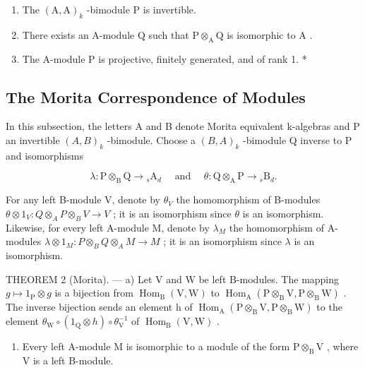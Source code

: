 \begin{enumerate}
\def\labelenumi{(\roman{enumi})}
\item
  The \((\mathrm{A},\mathrm{A})_{k}\) -bimodule P is invertible.
\item
  There exists an A-module \(\mathrm{Q}\) such that \(\mathrm{P} \otimes_{\mathrm{A}} \mathrm{Q}\) is isomorphic to \(\mathrm{A}\) .
\item
  The A-module P is projective, finitely generated, and of rank 1. *
\end{enumerate}

\subsection{The Morita Correspondence of Modules}

In this subsection, the letters A and B denote Morita equivalent k-algebras and P an invertible \((A,B)_{k}\) -bimodule. Choose a \((B,A)_{k}\) -bimodule Q inverse to P and isomorphisms

\[
\lambda : \mathrm{P} \otimes_ {\mathrm{B}} \mathrm{Q} \rightarrow {} _ {s} \mathrm{A} _ {d} \quad \text { and } \quad \theta : \mathrm{Q} \otimes_ {\mathrm{A}} \mathrm{P} \rightarrow {} _ {s} \mathrm{B} _ {d}.
\]

For any left B-module V, denote by \(\theta_{V}\) the homomorphism of B-modules \(\theta\otimes1_{V}:Q\otimes_{A}P\otimes_{B}V\to V\) ; it is an isomorphism since \(\theta\) is an isomorphism. Likewise, for every left A-module M, denote by \(\lambda_{M}\) the homomorphism of A-modules \(\lambda\otimes1_{M}:P\otimes_{B}Q\otimes_{A}M\to M\) ; it is an isomorphism since \(\lambda\) is an isomorphism.

THEOREM 2 (Morita). --- a) Let V and W be left B-modules. The mapping \(g \mapsto 1_{\mathrm{P}} \otimes g\) is a bijection from \(\operatorname{Hom}_{\mathrm{B}}(\mathrm{V}, \mathrm{W})\) to \(\operatorname{Hom}_{\mathrm{A}}(\mathrm{P} \otimes_{\mathrm{B}} \mathrm{V}, \mathrm{P} \otimes_{\mathrm{B}} \mathrm{W})\) . The inverse bijection sends an element h of \(\operatorname{Hom}_{\mathrm{A}}(\mathrm{P} \otimes_{\mathrm{B}} \mathrm{V}, \mathrm{P} \otimes_{\mathrm{B}} \mathrm{W})\) to the element \(\theta_{\mathrm{W}} \circ (1_{\mathrm{Q}} \otimes h) \circ \theta_{\mathrm{V}}^{-1}\) of \(\operatorname{Hom}_{\mathrm{B}}(\mathrm{V}, \mathrm{W})\) .

\begin{enumerate}
\def\labelenumi{\alph{enumi})}
\setcounter{enumi}{1}
\tightlist
\item
  Every left A-module M is isomorphic to a module of the form \(\mathrm{P} \otimes_{\mathrm{B}} \mathrm{V}\) , where V is a left B-module.
\end{enumerate}

